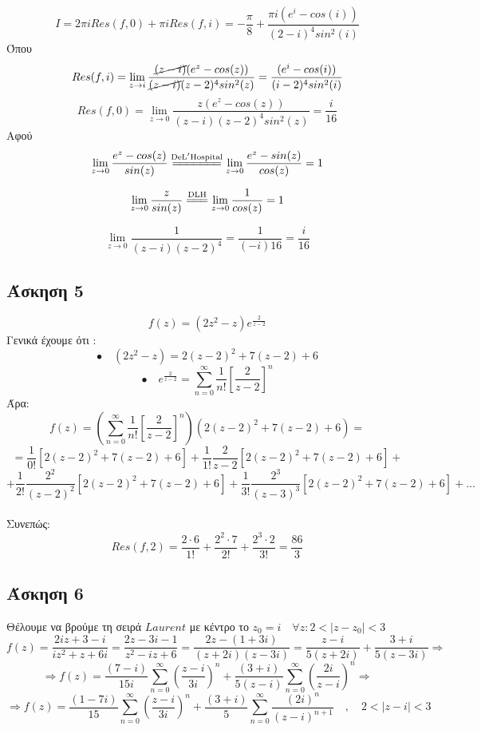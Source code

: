 \documentclass[12pt]{article}
\begin{document}
$$I=2\pi i Res(f,0) + \pi i Res(f,i)=-\frac{\pi}{8}
+\frac{\pi i (e^i-cos(i))}{(2-i)^4sin^2(i)}
$$ 
Όπου
$$
Res(f,i)=\lim_{z \rightarrow i}
\frac{\cancel{(z-i)}(e^z-cos(z))}{\cancel{(z-i)}(z-2)^{4}sin^2(z)}
=
\frac{(e^i-cos(i))}{(i-2)^{4}sin^2(i)}
$$
$$Res(f,0)=\lim_{z \rightarrow 0}\frac{z(e^z-cos(z))}{(z-i)(z-2)^{4}sin^2(z)}=\frac{i}{16}
$$
Αφού 
$$\lim_{z \rightarrow 0}\frac{e^z-cos(z)}{sin(z)} 
\overset{\mathrm{De L'Hospital}}{=\joinrel=\joinrel=\joinrel=\joinrel=\joinrel=\joinrel=}
\lim_{z \rightarrow 0}\frac{e^z-sin(z)}{cos(z)} 
=1
$$

$$
\lim_{z\rightarrow 0} \frac{z}{sin(z)}
\overset{\mathrm{DLH}}{=\joinrel=\joinrel=}
\lim_{z\rightarrow 0} \frac{1}{cos(z)}=1
$$

$$
\lim_{z \rightarrow 0} \frac{1}{(z-i)(z-2)^{4}}=
\frac{1}{(-i)16}=\frac{i}{16}
$$
\newpage
 \subsection{Άσκηση 5}
$$f(z)=(2z^2-z)e^{\frac{2}{z-2}}
$$
Γενικά έχουμε ότι : $$\bullet\quad(2z^2-z)=2(z-2)^2+7(z-2)+6$$  
$$\bullet\quad e^{\frac{2}{z-2}}=\sum_{n=0}^\infty \frac{1}{n!}\left[\frac{2}{z-2}\right]^n $$ 
Άρα: 
$$
f(z)=\left(\sum_{n=0}^\infty \frac{1}{n!}\left[\frac{2}{z-2}\right]^n
\right)
\left(
2(z-2)^2+7(z-2)+6
\right)=
$$
$$
=\frac{1}{0!}\left[
2(z-2)^2+7(z-2)+6
\right]
+\frac{1}{1!}\frac{2}{z-2}\left[
2(z-2)^2+7(z-2)+6
\right]+$$
$$
+\frac{1}{2!}\frac{2^2}{(z-2)^2}\left[
2(z-2)^2+7(z-2)+6
\right]
+ \frac{1}{3!}\frac{2^3}{(z-3)^3}\left[
2(z-2)^2+7(z-2)+6
\right]+\ldots
$$
\\
Συνεπώς:
$$
Res(f,2)=\frac{2\cdot6}{1!}+
\frac{2^2\cdot7}{2!}+\frac{2^3\cdot2}{3!}
=\frac{86}{3}
$$
\newpage
 \subsection{Άσκηση 6}
Θέλουμε να βρούμε τη σειρά $Laurent$ με κέντρο το $z_0=i \quad \forall z : 2<|z-z_0|<3 $ 
$$
f(z)=\frac{2iz+3-i}{iz^2+z+6i}=
\frac{2z-3i-1}{z^2-iz+6}=\frac{2z-(1+3i)}{(z+2i)(z-3i)}=\frac{z-i}{5(z+2i)}+
\frac{3+i}{5(z-3i)}\Rightarrow
$$
$$\Rightarrow f(z)=
\frac{(7-i)}{15i}\sum_{n=0}^{\infty} \left(\frac{z-i}{3i} \right)^n 
+
\frac{(3+i)}{5(z-i)}\sum_{n=0}^{\infty} \left(\frac{2i}{z-i} \right)^n \Rightarrow$$
$$
\Rightarrow 
f(z)=
\frac{(1-7i)}{15}\sum_{n=0}^{\infty} \left(\frac{z-i}{3i} \right)^n 
+
\frac{(3+i)}{5}\sum_{n=0}^{\infty} \frac{(2i)^n}{(z-i)^{n+1}} \quad, \quad 2<|z-i|<3
$$
\end{document}

